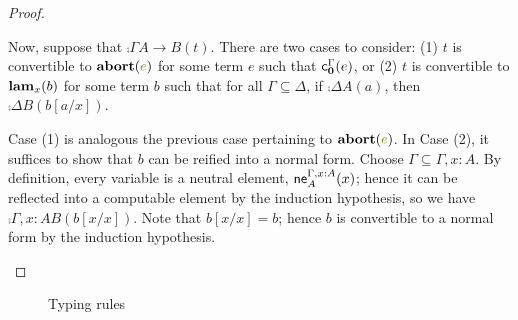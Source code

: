 \documentclass[a4paper]{article}
\begin{document}
\begin{proof}
\begin{itemize}
    Now, suppose that $\comp{\Gamma}{A \to B}(t)$.
    There are two cases to consider: (1) $t$ is convertible to $\tmAbort{e}$ for some term $e$ such that $\operatorname{\mathsf{c}}^{\Gamma}_{\mathbf{0}}(e)$, or (2) $t$ is convertible to $\operatorname{\mathbf{lam}}_{x}(b)$ for some term $b$ such that for all $\Gamma \subseteq \Delta$, if $\comp{\Delta}{A}(a)$, then $\comp{\Delta}{B}(b[a/x])$.

    Case (1) is analogous the previous case pertaining to $\tmAbort{e}$.
    In Case (2), it suffices to show that $b$ can be reified into a normal form.
    Choose $\Gamma \subseteq \Gamma,x : A$.
    By definition, every variable is a neutral element, \ie $\operatorname{\mathsf{ne}}^{\Gamma,x : A}_{A}(x)$; hence it can be reflected into a computable element by the induction hypothesis, so we have $\comp{\Gamma,x : A}{B}(b[x/x])$.
    Note that $b[x/x] = b$; hence $b$ is convertible to a normal form by the induction hypothesis.
  \end{itemize}
\end{proof}

\begin{figure}
  \centering
  \caption{Typing rules}
  \label{fig:0000}
\end{figure}
\end{document}
